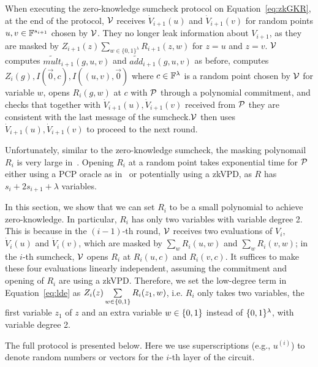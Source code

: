 When executing the zero-knowledge sumcheck protocol on Equation~\ref{eq:zkGKR}, at the end of the protocol, $\V$ receives $\dot{V}_{i+1}(u)$ and $\dot{V}_{i+1}(v)$ for random points $u,v\in\F^{s_{i+1}}$ chosen by $\V$. They no longer leak information about $V_{i+1}$, as they are masked by $Z_{i+1}(z)\sum\limits_{w \in \{0, 1\}^\lambda}R_{i+1}(z, w)$ for $z=u$ and $z=v$. $\V$ computes $\tilde{mult}_{i+1}(g,u,v)$ and $\tilde{add}_{i+1}(g,u,v)$ as before, computes $Z_i(g), I(\vec{0},c), I((u,v),\vec{0})$ where $c\in\F^\lambda$ is a random point chosen by $\V$ for variable $w$, opens $R_i(g,w)$ at $c$  with $\P$ through a polynomial commitment, and checks that together with $\dot{V}_{i+1}(u), \dot{V}_{i+1}(v)$ received from $\P$ they are consistent with the last message of the sumcheck.$\V$ then uses $\dot{V}_{i+1}(u), \dot{V}_{i+1}(v)$ to proceed to the next round.

Unfortunately, similar to the zero-knowledge sumcheck, the masking polynomail $R_i$ is very large in~\cite{zksumcheck}. Opening $R_i$ at a random point takes exponential time for $\P$ either using a PCP oracle as in~\cite{zksumcheck} or potentially using a zkVPD, as $R$ has $s_i+2s_{i+1}+\lambda$ variables.

In this section, we show that we can set $R_i$ to be a small polynomial to achieve zero-knowledge. In particular, $R_i$ has only two variables with variable degree 2. This is because in the $(i-1)$-th round, $\V$ receives two evaluations of $V_i$, $\dot{V}_i(u)$ and $\dot{V}_i(v)$,  which are masked by $\sum_{w}R_i(u,w)$ and $\sum_{w}R_i(v,w)$; in the $i$-th sumcheck, $\V$ opens $R_i$ at $R_i(u,c)$ and $R_i(v,c)$. It suffices to make these four evaluations linearly independent, assuming the commitment and opening of $R_i$ are using a zkVPD. Therefore, we set the low-degree term in Equation~\ref{eq:lde} as $Z_i(z)\sum\limits_{w \in\binary} R_i(z_1, w)$, i.e. $R_i$ only takes two variables, the first variable $z_1$ of $z$ and an extra variable $w\in\binary$ instead of $\binary^\lambda$, with variable degree 2. 

The full protocol is presented below. Here we use superscriptions (e.g., $u^{(i)}$) to denote random numbers or vectors for the $i$-th layer of the circuit.


